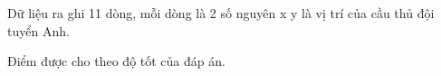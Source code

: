Dữ liệu ra ghi 11 dòng, mỗi dòng là 2 số nguyên x y là vị trí của cầu thủ đội tuyển Anh.

Điểm được cho theo độ tốt của đáp án.